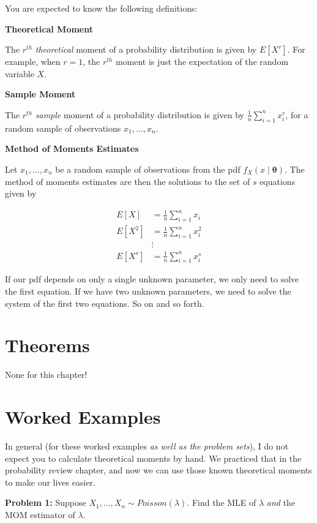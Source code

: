 \documentclass[
  letterpaper,
  DIV=11,
  numbers=noendperiod]{scrreprt}
\begin{document}
You are expected to know the following definitions:

\textbf{Theoretical Moment}

The \(r^{th}\) \emph{theoretical} moment of a probability distribution
is given by \(E[X^r]\). For example, when \(r = 1\), the \(r^{th}\)
moment is just the expectation of the random variable \(X\).

\textbf{Sample Moment}

The \(r^{th}\) \emph{sample} moment of a probability distribution is
given by \(\frac{1}{n} \sum_{i = 1}^n x_i^r\), for a random sample of
observations \(x_1, \dots, x_n\).

\textbf{Method of Moments Estimates}

Let \(x_1, \dots, x_n\) be a random sample of observations from the pdf
\(f_X(x \mid \boldsymbol{\theta})\). The method of moments estimates are
then the solutions to the set of \(s\) equations given by

\begin{align*}
  E[X] & = \frac{1}{n} \sum_{i = 1}^n x_i \\
  E[X^2] & = \frac{1}{n} \sum_{i = 1}^n x_i^2 \\
  & \vdots \\
  E[X^s] & = \frac{1}{n} \sum_{i = 1}^n x_i^s
\end{align*}

If our pdf depends on only a single unknown parameter, we only need to
solve the first equation. If we have two unknown parameters, we need to
solve the system of the first two equations. So on and so forth.

\section{Theorems}\label{theorems-2}

None for this chapter!

\section{Worked Examples}\label{worked-examples-2}

In general (for these worked examples \emph{as well as the problem
sets}), I do not expect you to calculate theoretical moments by hand. We
practiced that in the probability review chapter, and now we can use
those known theoretical moments to make our lives easier.

\textbf{Problem 1:} Suppose \(X_1, \dots, X_n \sim Poisson(\lambda)\).
Find the MLE of \(\lambda\) \emph{and} the MOM estimator of \(\lambda\).
\end{document}
